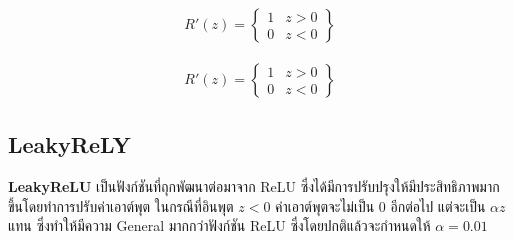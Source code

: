 \begin{figure}[H]
\begin{subfigure}{0.5\textwidth}
      \caption{%
          \begin{equation}
              \begin{split}R'(z) =
                  \begin{Bmatrix}
                      1 & z>0 \\
                      0 & z<0
                  \end{Bmatrix}
              \end{split}
          \end{equation}
      }
      \label{fig:actfunc_relu_der}
  \end{subfigure}
\end{figure}

\subsection{LeakyReLY}

\textbf{LeakyReLU}\autocite{he2015} เป็นฟังก์ชันที่ถุกพัฒนาต่อมาจาก ReLU ซึ่งได้มีการปรับปรุงให้มีประสิทธิภาพมากขึ้นโดยทำการปรับค่าเอาต์พุต ในกรณีที่อินพุต $z < 0$ ค่าเอาต์พุตจะไม่เป็น 0 อีกต่อไป แต่จะเป็น $\alpha z$ แทน ซึ่งทำให้มีความ General มากกว่าฟังก์ชัน ReLU ซึ่งโดยปกติแล้วจะกำหนดให้ $\alpha = 0.01$

